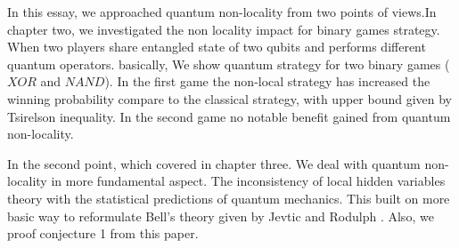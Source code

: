 In this essay, we approached quantum non-locality from two points of views.In chapter two, we investigated the non locality  impact for binary games strategy. When two  players share entangled state of two qubits and performs different quantum operators. basically, We show quantum strategy for two binary games ($XOR$ and $NAND$). In the first game the non-local strategy has increased the winning probability  compare to the classical strategy, with upper bound given by Tsirelson inequality\citep*{Cirel'son1980}. In the second game no notable benefit  gained from quantum non-locality.

In the second point, which covered in chapter three. We deal with quantum non-locality  in more fundamental aspect. The inconsistency of local hidden variables theory with the statistical predictions of quantum mechanics.
This built on more basic way to reformulate Bell's theory given by  Jevtic and Rodulph \citep*{Jevtic:2015:10.1364/JOSAB.32.000A50}. Also, we  proof conjecture 1  from this paper. 



